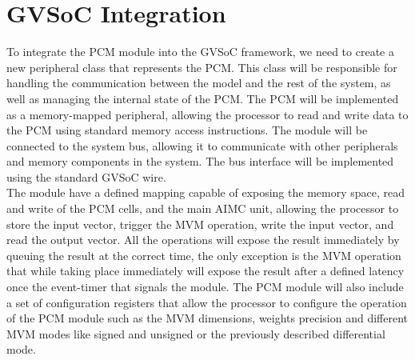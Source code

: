 \section{GVSoC Integration}\label{sec:gvsoc_int}
To integrate the PCM module into the GVSoC framework, we need to create a new peripheral class that represents the PCM.
This class will be responsible for handling the communication between the model and the rest of the system,
as well as managing the internal state of the PCM.
The PCM will be implemented as a memory-mapped peripheral, allowing the processor to read and write data to the PCM using standard memory access instructions.
The module will be connected to the system bus, allowing it to communicate with other peripherals and memory components in the system.
The bus interface will be implemented using the standard GVSoC wire.\\
The module have a defined mapping capable of exposing the memory space, read and write of the PCM cells, and the main AIMC unit, 
allowing the processor to store the input vector, trigger the MVM operation, write the input vector, and read the output vector.
All the operations will expose the result immediately by queuing the result at the correct time, the only exception is the MVM operation that while taking place immediately will expose the result after a defined latency once the event-timer that signals the module.
The PCM module will also include a set of configuration registers that allow the processor to configure the operation of the PCM module such as the MVM dimensions, weights precision and different MVM modes like signed and unsigned or the previously described differential mode.
